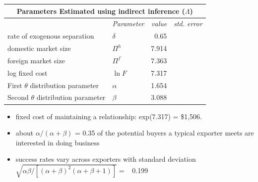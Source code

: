 \documentclass[notes=show]{beamer}
\begin{document}
\begin{frame}%


\begin{center}
{\small 
\begin{tabular}{llrr}
\hline\hline
\multicolumn{4}{c}{\textbf{Parameters Estimated using indirect inference (}$%
\Lambda $\textbf{)}} \\ \hline
                                        & \textit{Parameter} & \textit{value} & \textit{std. error} \\ \cline{2-4}
rate of exogenous separation            & $\delta $          & 0.65           &                     \\
domestic market size                    & $\Pi ^{h}$         & 7.914          &                     \\
foreign market size                     & $\Pi ^{f}$         & 7.363          &                     \\
log fixed cost                          & $\ln F$            & 7.317          &                     \\
First $\theta $ distribution parameter  & $\alpha $          & 1.654          &                     \\
Second $\theta $ distribution parameter & $\beta $           & 3.088          &                     \\ \hline
\end{tabular}%
}
\end{center}

\begin{itemize}
\item {\small fixed cost of maintaining a relationship: exp(7.317) =
\$1,506.}

\item {\small about }$\alpha /(\alpha +\beta )$ {\small = 0.35 of the
potential buyers a typical exporter meets are interested in doing business}

\item {\small success rates vary across exporters with standard deviation\ }$%
\sqrt{\alpha \beta /\left[ (\alpha +\beta )^{2}(\alpha +\beta +1)\right] }=$%
{\small \ 0.199}
\end{itemize}

\end{frame}%
\end{document}
